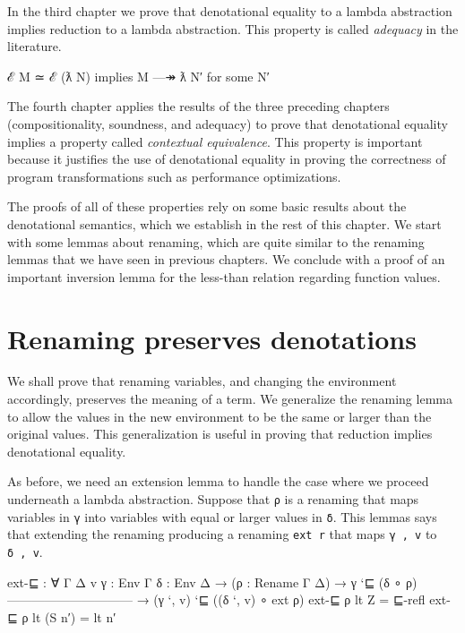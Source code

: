 In the third chapter we prove that denotational equality to a lambda
abstraction implies reduction to a lambda abstraction. This property is
called \emph{adequacy} in the literature.

\begin{myDisplay}
ℰ M ≃ ℰ (ƛ N)  implies M —↠ ƛ N′ for some N′
\end{myDisplay}

The fourth chapter applies the results of the three preceding chapters
(compositionality, soundness, and adequacy) to prove that denotational
equality implies a property called \emph{contextual equivalence}. This
property is important because it justifies the use of denotational
equality in proving the correctness of program transformations such as
performance optimizations.

The proofs of all of these properties rely on some basic results about
the denotational semantics, which we establish in the rest of this
chapter. We start with some lemmas about renaming, which are quite
similar to the renaming lemmas that we have seen in previous chapters.
We conclude with a proof of an important inversion lemma for the
less-than relation regarding function values.

\hypertarget{renaming-preserves-denotations}{%
\section{Renaming preserves
denotations}\label{renaming-preserves-denotations}}

We shall prove that renaming variables, and changing the environment
accordingly, preserves the meaning of a term. We generalize the renaming
lemma to allow the values in the new environment to be the same or
larger than the original values. This generalization is useful in
proving that reduction implies denotational equality.

As before, we need an extension lemma to handle the case where we
proceed underneath a lambda abstraction. Suppose that \texttt{ρ} is a
renaming that maps variables in \texttt{γ} into variables with equal or
larger values in \texttt{δ}. This lemmas says that extending the
renaming producing a renaming \texttt{ext\ r} that maps \texttt{γ\ ,\ v}
to \texttt{δ\ ,\ v}.

\begin{fence}
\begin{code}
ext-⊑ : ∀ {Γ Δ v} {γ : Env Γ} {δ : Env Δ}
  → (ρ : Rename Γ Δ)
  → γ `⊑ (δ ∘ ρ)
    ------------------------------
  → (γ `, v) `⊑ ((δ `, v) ∘ ext ρ)
ext-⊑ ρ lt Z = ⊑-refl
ext-⊑ ρ lt (S n′) = lt n′
\end{code}
\end{fence}

